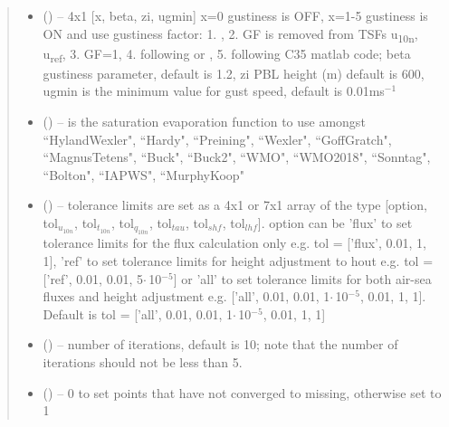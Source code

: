 \documentclass[letterpaper,10pt,english]{sphinxmanual}
\begin{document}
\begin{fulllineitems}
\begin{quote}
\begin{description}
\begin{itemize}
\item {} 
 (\href{https://docs.python.org/3/library/functions.html\#int}{}) -- 4x1 [x, beta, zi, ugmin] x=0 gustiness is OFF, x=1-5 gustiness is ON
            and use gustiness factor: 1. \cite{Fairall_etal_2003}, 2. GF is removed from TSFs u\textsubscript{10n}, u\textsubscript{ref}, 3. GF=1, 4. following \cite{Zeng_etal_1998} or
            \cite{Brodeau_etal_2006}, 5. following C35 matlab code; beta gustiness parameter, default is 1.2, zi PBL height (m) default is 600, ugmin is the minimum value for gust speed, default is 0.01ms$^{-1}$

\item {} 
 (\href{https://docs.python.org/3/library/stdtypes.html\#str}{}) -- is the saturation evaporation function to use amongst ``HylandWexler", ``Hardy", ``Preining", ``Wexler", ``GoffGratch", ``MagnusTetens", ``Buck", ``Buck2", ``WMO", ``WMO2018", ``Sonntag", ``Bolton", ``IAPWS", ``MurphyKoop"

\item {} 
 (\href{https://docs.python.org/3/library/functions.html\#float}{}) -- tolerance limits are set as a 4x1 or 7x1 array of the type [option, tol$_{u_{10n}}$, tol$_{t_{10n}}$, tol$_{q_{10n}}$, tol$_{tau}$, tol$_{shf}$, tol$_{lhf}$]. option can be 'flux' to set tolerance limits for the flux calculation only e.g. tol = ['flux', 0.01, 1, 1], 'ref' to set tolerance limits  for height adjustment to hout e.g. tol = ['ref', 0.01, 0.01, 5$\cdot$\,10$^{-5}$] or 'all' to set tolerance limits for both air-sea fluxes and height adjustment e.g. ['all', 0.01, 0.01, 1$\cdot$\,10$^{-5}$, 0.01, 1, 1]. Default is tol =  ['all', 0.01, 0.01, 1$\cdot$\,10$^{-5}$, 0.01, 1, 1]

\item {} 
 (\href{https://docs.python.org/3/library/functions.html\#int}{}) -- number of iterations, default is 10; note that the number of iterations should not be less than 5.

\item {} 
 (\href{https://docs.python.org/3/library/functions.html\#int}{}) -- 0 to set points that have not converged to missing, otherwise set to 1 


\end{itemize}
\end{description}
\end{quote}
\end{fulllineitems}
\end{document}
